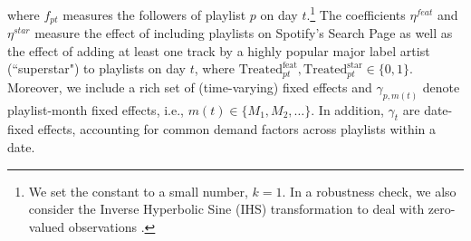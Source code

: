 where $f_{pt}$ measures the followers of playlist $p$ on day $t$.\footnote{We set the constant to a small number, $k=1$. In a robustness check, we also consider the Inverse Hyperbolic Sine (IHS) transformation to deal with zero-valued observations \citep{ihs}.} The coefficients $\eta^{feat}$ and $\eta^{star}$ measure the effect of including playlists on Spotify's Search Page as well as the effect of adding at least one track by a highly popular major label artist (``superstar") to playlists on day $t$, where $\text{Treated}_{pt}^{\text{feat}}, \text{Treated}_{pt}^{\text{star}} \in \{0,1\}$. %
Moreover, we include a rich set of (time-varying) fixed effects and $\gamma_{p,m(t)}$ denote playlist-month fixed effects, i.e., $m(t) \in \{M_1, M_2, \dots \}$. In addition, $\gamma_t$ are date-fixed effects, accounting for common demand factors across playlists within a date. 

